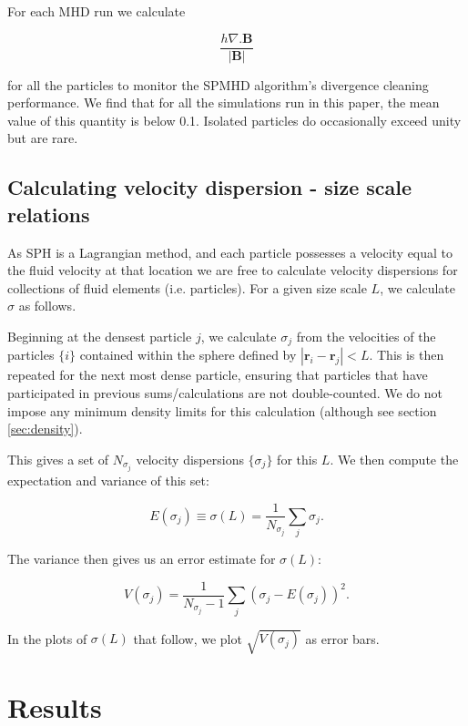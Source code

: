 \documentclass[a4paper,fleqn,usenatbib]{mnras}
\begin{document}
For each MHD run we calculate 

\begin{equation}
\frac{h \nabla .\mathbf{B}}{\left| \mathbf{B} \right|}
\end{equation}

\noindent for all the particles to monitor the SPMHD algorithm's divergence cleaning performance.  We find that for all the simulations run in this paper, the mean value of this quantity is below 0.1.  Isolated particles do occasionally exceed unity but are rare.

\subsection{Calculating velocity dispersion - size scale relations}

\noindent As SPH is a Lagrangian method, and each particle possesses a velocity equal to the fluid velocity at that location we are free to calculate velocity dispersions for collections of fluid elements (i.e. particles).  For a given size scale $L$, we calculate $\sigma$ as follows.

Beginning at the densest particle $j$, we calculate $\sigma_j$ from the velocities of the particles $\{i\}$ contained within the sphere defined by $\left|\mathbf{r}_i - \mathbf{r}_j\right| < L$.  This is then repeated for the next most dense particle, ensuring that particles that have participated in previous sums/calculations are not double-counted.  We do not impose any minimum density limits for this calculation (although see section \ref{sec:density}).

This gives a set of $N_{\sigma_j}$ velocity dispersions $\{\sigma_j\}$ for this $L$.  We then compute the expectation and variance of this set:

\begin{equation}
E(\sigma_j) \equiv \sigma(L) = \frac{1}{N_{\sigma_j}} \sum_j \sigma_j.
\end{equation} 

The variance then gives us an error estimate for $\sigma(L)$:

\begin{equation}
V(\sigma_j) = \frac{1}{N_{\sigma_j}-1} \sum_j (\sigma_j - E(\sigma_j))^2.
\end{equation}

\noindent In the plots of $\sigma(L)$ that follow, we plot $\sqrt{V(\sigma_j)}$ as error bars.

\section{Results}
\label{sec:results}
\end{document}
